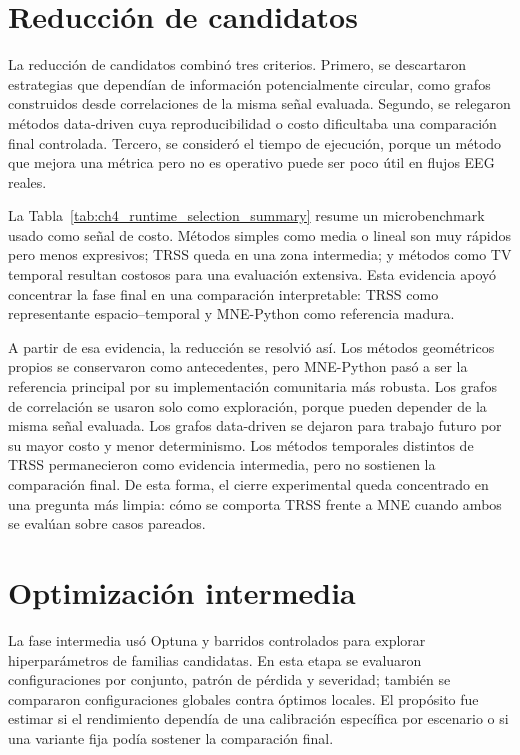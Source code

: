 \section{Reducción de candidatos}

La reducción de candidatos combinó tres criterios. Primero, se descartaron estrategias que dependían de información potencialmente circular, como grafos construidos desde correlaciones de la misma señal evaluada. Segundo, se relegaron métodos data-driven cuya reproducibilidad o costo dificultaba una comparación final controlada. Tercero, se consideró el tiempo de ejecución, porque un método que mejora una métrica pero no es operativo puede ser poco útil en flujos EEG reales.

La Tabla~\ref{tab:ch4_runtime_selection_summary} resume un microbenchmark usado como señal de costo. Métodos simples como media o lineal son muy rápidos pero menos expresivos; TRSS queda en una zona intermedia; y métodos como TV temporal resultan costosos para una evaluación extensiva. Esta evidencia apoyó concentrar la fase final en una comparación interpretable: TRSS como representante espacio--temporal y MNE-Python como referencia madura.



A partir de esa evidencia, la reducción se resolvió así. Los métodos geométricos propios se conservaron como antecedentes, pero MNE-Python pasó a ser la referencia principal por su implementación comunitaria más robusta. Los grafos de correlación se usaron solo como exploración, porque pueden depender de la misma señal evaluada. Los grafos data-driven se dejaron para trabajo futuro por su mayor costo y menor determinismo. Los métodos temporales distintos de TRSS permanecieron como evidencia intermedia, pero no sostienen la comparación final. De esta forma, el cierre experimental queda concentrado en una pregunta más limpia: cómo se comporta TRSS frente a MNE cuando ambos se evalúan sobre casos pareados.

\section{Optimización intermedia}

La fase intermedia usó Optuna y barridos controlados para explorar hiperparámetros de familias candidatas. En esta etapa se evaluaron configuraciones por conjunto, patrón de pérdida y severidad; también se compararon configuraciones globales contra óptimos locales. El propósito fue estimar si el rendimiento dependía de una calibración específica por escenario o si una variante fija podía sostener la comparación final.

